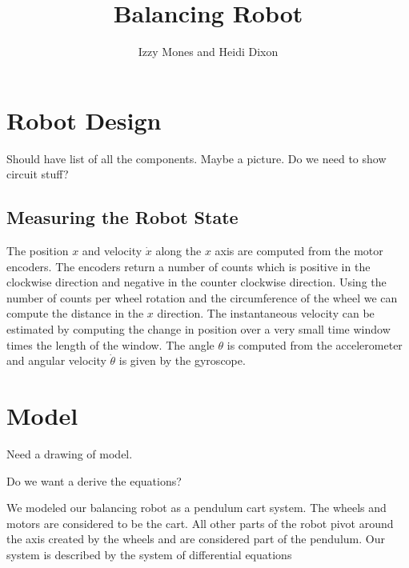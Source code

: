 \documentclass[]{article}
\title{Balancing Robot}
\author{Izzy Mones and Heidi Dixon}
\begin{document}
	\maketitle


 
\section*{Robot Design}
Should have list of all the components. Maybe a picture. Do we need to show circuit stuff?

\subsection*{Measuring the Robot State}
The position $x$ and velocity $\dot{x}$ along the $x$ axis are computed from the motor encoders. The encoders return a number of counts which is positive in the clockwise direction and negative in the counter clockwise direction. Using the number of counts per wheel rotation and the circumference of the wheel we can compute the distance in the $x$ direction. The instantaneous velocity can be estimated by computing the change in position over a very small time window times the length of the window. The angle $\theta$ is computed from the accelerometer and angular velocity $\dot{\theta}$ is given by the gyroscope.

\section*{Model}
Need a drawing of model.

Do we want a derive the equations?

We modeled our balancing robot as a pendulum cart system. The wheels and motors are considered to be the cart. All other parts of the robot pivot around the axis created by the wheels and are considered part of the pendulum. Our system is described by the system of differential equations
\end{document}
